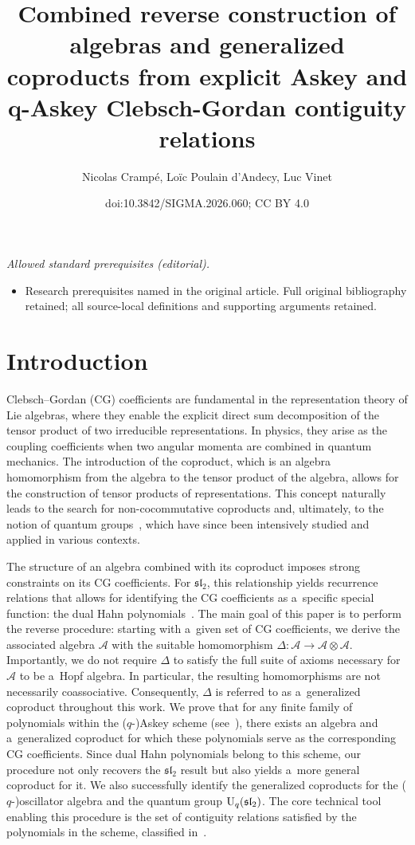\documentclass[10pt,a4paper]{amsart}
\title{Combined reverse construction of algebras and generalized coproducts from explicit Askey and q-Askey Clebsch-Gordan contiguity relations}
\author{Nicolas Crampé, Loïc Poulain d’Andecy, Luc Vinet}
\date{doi:10.3842/SIGMA.2026.060; CC BY 4.0}
\numberwithin{equation}{section}
\theoremstyle{definition}
\begin{document}
\maketitle
\noindent\textit{Allowed standard prerequisites (editorial).}\begin{itemize}
\item Research prerequisites named in the original article. Full original bibliography retained; all source-local definitions and supporting arguments retained.
\end{itemize}\medskip
\section{Introduction}

Clebsch--Gordan (CG) coefficients are fundamental in the representation theory of Lie algebras, where they enable the explicit direct sum decomposition of the tensor product of two irreducible representations. In physics, they arise as the coupling coefficients when two angular momenta are combined in quantum mechanics. The introduction of the coproduct, which is an algebra homomorphism from the algebra to the tensor product of the algebra, allows for the construction of tensor products of representations. This concept naturally leads to the search for non-cocommutative coproducts and, ultimately, to the notion of quantum groups~\cite{Drin1, Drin2}, which have since been intensively studied and applied in various contexts.

The structure of an algebra combined with its coproduct imposes strong constraints on its CG coefficients. For $\mathfrak{sl}_2$, this relationship yields recurrence relations that allows for identifying the CG coefficients as a~specific special function: the dual Hahn polynomials~\cite{Koor,Racah}.
The main goal of this paper is to perform the reverse procedure: starting with a~given set of CG coefficients, we derive the associated algebra $\mathcal{A}$ with the suitable homomorphism $\Delta\colon \mathcal{A}\to \mathcal{A}\otimes \mathcal{A}$.
Importantly, we do not require $\Delta$ to satisfy the full suite of axioms necessary for $\mathcal{A}$ to be a~Hopf algebra. In particular, the resulting homomorphisms are not necessarily coassociative. Consequently, $\Delta$ is referred to as a~generalized coproduct throughout this work.
 We prove that for any finite family of polynomials within the ($q$-)Askey scheme (see~\cite{KLS10}), there exists an algebra and a~generalized coproduct for which these polynomials serve as the corresponding CG coefficients.
Since dual Hahn polynomials belong to this scheme, our procedure not only recovers the $\mathfrak{sl}_2$ result but also yields a~more general coproduct for it. We also successfully identify the generalized coproducts for the ($q$-)oscillator algebra and the quantum group ${\rm U}_q(\mathfrak{sl}_2)$. The core technical tool enabling this procedure is the set of contiguity relations satisfied by the polynomials in the scheme, classified in~\cite{contiguity}.
\end{document}
